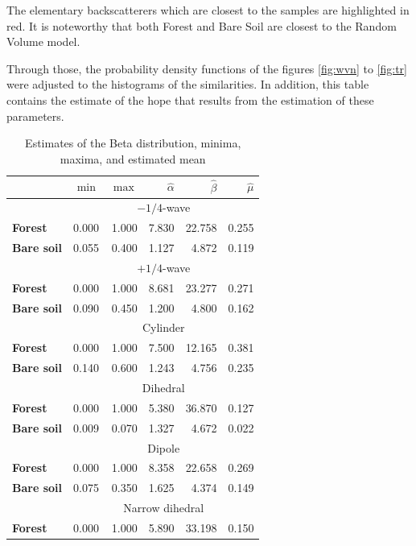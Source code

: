 \documentclass[conference]{IEEEtran}
\begin{document}
The elementary backscatterers which are closest to the samples are highlighted in red.
It is noteworthy that both Forest and Bare Soil are closest to the Random Volume model.

Through those, the probability density functions of the figures \ref{fig:wvn} to \ref{fig:tr} were adjusted to the histograms of the similarities. In addition, this table contains the estimate of the hope that results from the estimation of these parameters.

\balance
\begin{table}[hbt]
\centering
\caption{Estimates of the Beta distribution, minima, maxima, and estimated mean}\label{tab:estimated_params}     
\begin{tabular}{lrrrrr}
\toprule
& $\min$ & $\max$ & $\widehat\alpha$ & $\widehat\beta$ & $\widehat\mu$\\ \midrule
& \multicolumn{5}{c}{$-1/4$-wave}\\
\cmidrule(lr){2-6}
\textbf{Forest} & 0.000 & 1.000 & 7.830 & 22.758 & 0.255\\
\textbf{Bare soil} & 0.055 & 0.400 & 1.127 & 4.872 & 0.119\\
\midrule
%
& \multicolumn{5}{c}{$+1/4$-wave}\\
\cmidrule(lr){2-6}
\textbf{Forest} & 0.000 & 1.000 & 8.681 & 23.277 & 0.271\\
\textbf{Bare soil} & 0.090 & 0.450 & 1.200 & 4.800 & 0.162\\
\midrule
%
& \multicolumn{5}{c}{Cylinder}\\
\cmidrule(lr){2-6}
\textbf{Forest} & 0.000 & 1.000 & 7.500 & 12.165 & 0.381\\
\textbf{Bare soil} & 0.140 & 0.600 & 1.243 & 4.756 & 0.235\\
\midrule
%
& \multicolumn{5}{c}{Dihedral}\\
\cmidrule(lr){2-6}
\textbf{Forest} & 0.000 & 1.000 & 5.380 & 36.870 & 0.127\\
\textbf{Bare soil} & 0.009 & 0.070 & 1.327 & 4.672 & 0.022\\
\midrule
%
& \multicolumn{5}{c}{Dipole}\\
\textbf{Forest} & 0.000 & 1.000 & 8.358 & 22.658 & 0.269\\
\textbf{Bare soil} & 0.075 & 0.350 & 1.625 & 4.374 & 0.149\\
\midrule
%
& \multicolumn{5}{c}{Narrow dihedral}\\
\cmidrule(lr){2-6}
\textbf{Forest} & 0.000 & 1.000 & 5.890 & 33.198 & 0.150\\

\end{tabular}
\end{table}
\end{document}
